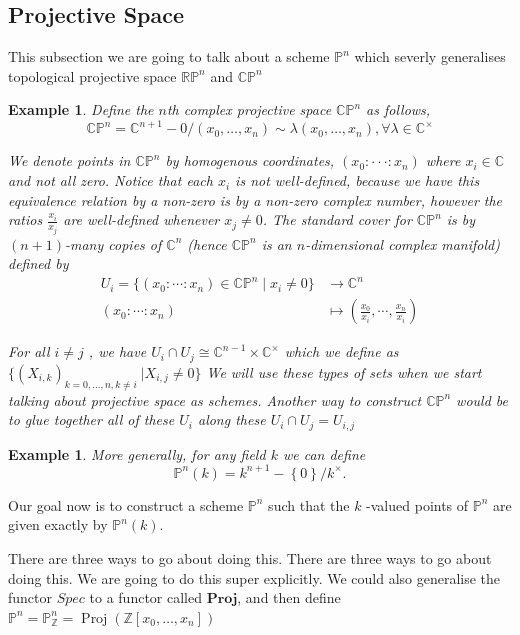 \documentclass{article}
\newtheorem{example}[theorem]{Example}
\begin{document}
\newpage
\subsection{Projective Space}
This subsection we are going to talk about a scheme $\mathbb{P}^{n}$ which severly generalises topological projective space $\mathbb{R}\mathbb{P}^{n}$ and $\mathbb{C}\mathbb{P}^{n}$ 
\begin{example}
    Define the $n$th complex projective space $\mathbb{C}\mathbb{P}^{n}$ as follows,
$$
\mathbb{C}\mathbb{P}^{n}=\mathbb{C}^{n+1}-0 
 / (x_{0},\ldots,x_{n})\sim\lambda(x_{0},\ldots,x_{n}),\forall\lambda\in\mathbb{C}^{\times}
$$

We denote points in $\mathbb{C}\mathbb{P}^{n}$ by homogenous coordinates, $(x_{0}:\cdot\cdot\cdot:x_{n})$ where $x_{i}\in\mathbb{C}$ and not all zero. Notice that each $x_i$ is not well-defined, because we have this equivalence relation by a non-zero is by a non-zero complex number, however the ratios $\frac{x_i}{x_j}$ are well-defined whenever $x_j\ne 0$. The standard cover for $\mathbb{C}\mathbb{P}^{n}$ is by $(n + 1)$-many copies of $\mathbb C^n$ (hence $\mathbb {CP}^n$ is an $n$-dimensional complex manifold) defined by
\begin{align*}
\label{sup}
U_{i}=\{(x_{0}:\cdots:x_{n})\in{\mathbb{CP}}^{n}\mid x_{i}\neq0\}&
\longrightarrow{\mathbb{C}}^{n} \\
(x_{0}:\cdots:x_{n})
&\mapsto
(\frac{x_0}{x_i},\cdots,\frac{x_n}{x_i})
 \end{align*}
 
For all $i\neq j$ , we have $U_{i}\cap U_{j}\cong\mathbb{C}^{n-1}\times\mathbb{C}^{\times}$ which we define as $\{(X_{i,k})_{k=0,\ldots,n,k\neq i}\:|X_{i,j}\neq0\}$ We will use these types of sets when we start talking about projective space as schemes. Another way to construct $\mathbb{CP}^{n}$ would be to glue together all of these $U_{i}$ along these $U_{i}\cap U_{j}=U_{i,j}$ 
\end{example}

\begin{example}
    More generally, for any field $k$ we can define
$$
\mathbb P^{n}(k)=k^{n+1}-\left\{0\right\}/k^{\times}. 
$$
\end{example}

Our goal now is to construct a scheme $\mathbb{P}^{n}$ such that the $k$ -valued points of $\mathbb{P}^{n}$ are given exactly by $\mathbb{P}^{n}(k)$.

There are three ways to go about doing this.  There are three ways to go about doing this. We are going to do this super explicitly. We could
also generalise the functor $Spec$ to a functor called $\bm{Proj}$, and then define $\mathbb{P}^{n}=\mathbb{P}^{n}_{\mathbb Z}=\operatorname{Proj}(\mathbb{Z}[x_{0},\ldots,x_{n}])$
\end{document}

